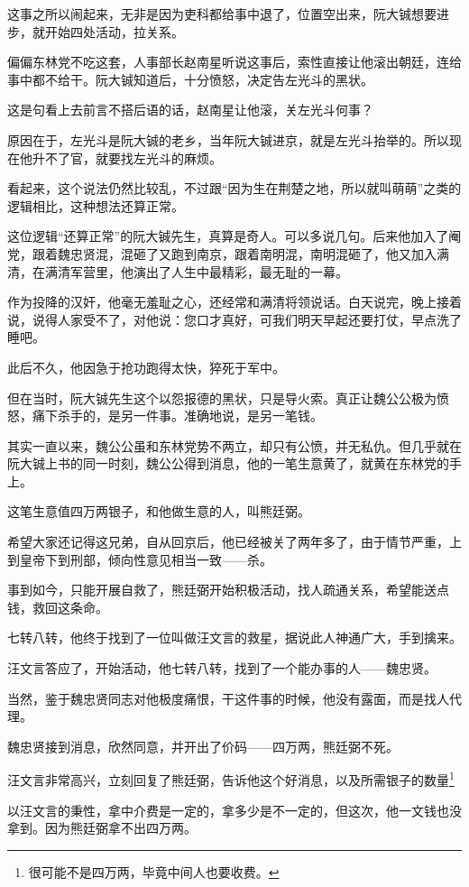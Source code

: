 \begin{multicols}{\theparacolNo}
这事之所以闹起来，无非是因为吏科都给事中退了，位置空出来，阮大铖想要进步，就开始四处活动，拉关系。

偏偏东林党不吃这套，人事部长赵南星听说这事后，索性直接让他滚出朝廷，连给事中都不给干。阮大铖知道后，十分愤怒，决定告左光斗的黑状。

这是句看上去前言不搭后语的话，赵南星让他滚，关左光斗何事？

原因在于，左光斗是阮大铖的老乡，当年阮大铖进京，就是左光斗抬举的。所以现在他升不了官，就要找左光斗的麻烦。

看起来，这个说法仍然比较乱，不过跟“因为生在荆楚之地，所以就叫萌萌”之类的逻辑相比，这种想法还算正常。

这位逻辑“还算正常”的阮大铖先生，真算是奇人。可以多说几句。后来他加入了阉党，跟着魏忠贤混，混砸了又跑到南京，跟着南明混，南明混砸了，他又加入满清，在满清军营里，他演出了人生中最精彩，最无耻的一幕。

作为投降的汉奸，他毫无羞耻之心，还经常和满清将领说话。白天说完，晚上接着说，说得人家受不了，对他说：您口才真好，可我们明天早起还要打仗，早点洗了睡吧。

此后不久，他因急于抢功跑得太快，猝死于军中。

但在当时，阮大铖先生这个以怨报德的黑状，只是导火索。真正让魏公公极为愤怒，痛下杀手的，是另一件事。准确地说，是另一笔钱。

其实一直以来，魏公公虽和东林党势不两立，却只有公愤，并无私仇。但几乎就在阮大铖上书的同一时刻，魏公公得到消息，他的一笔生意黄了，就黄在东林党的手上。

这笔生意值四万两银子，和他做生意的人，叫熊廷弼。

希望大家还记得这兄弟，自从回京后，他已经被关了两年多了，由于情节严重，上到皇帝下到刑部，倾向性意见相当一致——杀。

事到如今，只能开展自救了，熊廷弼开始积极活动，找人疏通关系，希望能送点钱，救回这条命。

七转八转，他终于找到了一位叫做汪文言的救星，据说此人神通广大，手到擒来。

汪文言答应了，开始活动，他七转八转，找到了一个能办事的人——魏忠贤。

当然，鉴于魏忠贤同志对他极度痛恨，干这件事的时候，他没有露面，而是找人代理。

魏忠贤接到消息，欣然同意，并开出了价码——四万两，熊廷弼不死。

汪文言非常高兴，立刻回复了熊廷弼，告诉他这个好消息，以及所需银子的数量\footnote{很可能不是四万两，毕竟中间人也要收费。}

以汪文言的秉性，拿中介费是一定的，拿多少是不一定的，但这次，他一文钱也没拿到。因为熊廷弼拿不出四万两。


\end{multicols}
